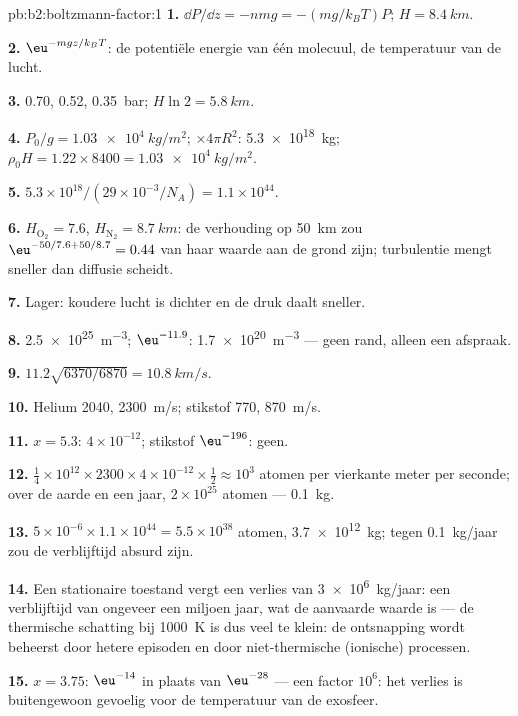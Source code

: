 \begin{solution}{pb:b2:boltzmann-factor:1}
\textbf{1.} $\dd P/\dd z = -nmg = -(mg/k_BT)P$; $H = \qty{8.4}{km}$.

\textbf{2.} $\eu^{-mgz/k_BT}$: de potentiële energie van één molecuul, de
temperatuur van de lucht.

\textbf{3.} \qty{0.70}{}, \qty{0.52}{}, \qty{0.35}{bar}; $H\ln 2 = \qty{5.8}{km}$.

\textbf{4.} $P_0/g = \qty{1.03e4}{kg/m^2}$; $\times 4\pi R^2$:
\qty{5.3e18}{kg}; $\rho_0H =
1.22 \times 8400 = \qty{1.03e4}{kg/m^2}$.

\textbf{5.} $5.3 \times 10^{18}/(29 \times 10^{-3}/N_A) = 1.1 \times 10^{44}$.

\textbf{6.} $H_{\text{O}_2} = 7.6$, $H_{\text{N}_2} = \qty{8.7}{km}$: de
verhouding op \qty{50}{km}
zou $\eu^{-50/7.6 + 50/8.7} = 0.44$ van haar waarde aan de grond zijn;
turbulentie mengt
sneller dan diffusie scheidt.

\textbf{7.} Lager: koudere lucht is dichter en de druk daalt sneller.

\textbf{8.} \qty{2.5e25}{m^{-3}}; $\eu^{-11.9}$: \qty{1.7e20}{m^{-3}} ---
geen rand, alleen een
afspraak.

\textbf{9.} $11.2\sqrt{6370/6870} = \qty{10.8}{km/s}$.

\textbf{10.} Helium \qty{2040}{}, \qty{2300}{m/s}; stikstof \qty{770}{},
\qty{870}{m/s}.

\textbf{11.} $x = 5.3$: $4 \times 10^{-12}$; stikstof $\eu^{-196}$: geen.

\textbf{12.}
$\tfrac14 \times 10^{12} \times 2300 \times 4 \times 10^{-12} \times \tfrac12 \approx
10^3$
atomen per vierkante meter per seconde; over de aarde en een jaar,
$2 \times 10^{25}$ atomen --- \qty{0.1}{kg}.

\textbf{13.}
$5 \times 10^{-6} \times 1.1 \times 10^{44} = 5.5 \times 10^{38}$ atomen,
\qty{3.7e12}{kg};
tegen \qty{0.1}{kg/jaar} zou de verblijftijd absurd zijn.

\textbf{14.} Een stationaire toestand vergt een verlies van
\qty{3e6}{kg/jaar}: een verblijftijd
van ongeveer een miljoen jaar, wat de aanvaarde waarde is --- de
thermische schatting bij \qty{1000}{K} is dus veel te klein: de ontsnapping wordt
beheerst door hetere episoden en door niet-thermische (ionische) processen.

\textbf{15.} $x = 3.75$: $\eu^{-14}$ in plaats van $\eu^{-28}$ --- een
factor $10^6$:
het verlies is buitengewoon gevoelig voor de temperatuur van de exosfeer.


\end{solution}
